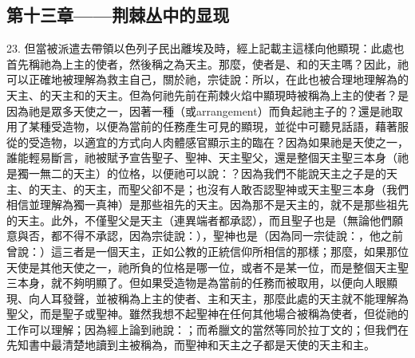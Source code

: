 
\subsection{第十三章——荆棘丛中的显现}

23. 但當被派遣去帶領以色列子民出離埃及時，經上記載主這樣向他顯現：此處也首先稱祂為上主的使者，然後稱之為天主。那麼，使者是、和的天主嗎？因此，祂可以正確地被理解為救主自己，關於祂，宗徒說：所以，在此也被合理地理解為的天主、的天主和的天主。但為何祂先前在荊棘火焰中顯現時被稱為上主的使者？是因為祂是眾多天使之一，因著一種（或arrangement）而負起祂主子的？還是祂取用了某種受造物，以便為當前的任務產生可見的顯現，並從中可聽見話語，藉著服從的受造物，以適宜的方式向人肉體感官顯示主的臨在？因為如果祂是天使之一，誰能輕易斷言，祂被賦予宣告聖子、聖神、天主聖父，還是整個天主聖三本身（祂是獨一無二的天主）的位格，以便祂可以說：？因為我們不能說天主之子是的天主、的天主、的天主，而聖父卻不是；也沒有人敢否認聖神或天主聖三本身（我們相信並理解為獨一真神）是那些祖先的天主。因為那不是天主的，就不是那些祖先的天主。此外，不僅聖父是天主（連異端者都承認），而且聖子也是（無論他們願意與否，都不得不承認，因為宗徒說：），聖神也是（因為同一宗徒說：，他之前曾說：）這三者是一個天主，正如公教的正統信仰所相信的那樣；那麼，如果那位天使是其他天使之一，祂所負的位格是哪一位，或者不是某一位，而是整個天主聖三本身，就不夠明顯了。但如果受造物是為當前的任務而被取用，以便向人眼顯現、向人耳發聲，並被稱為上主的使者、主和天主，那麼此處的天主就不能理解為聖父，而是聖子或聖神。雖然我想不起聖神在任何其他場合被稱為使者，但從祂的工作可以理解；因為經上論到祂說：；而希臘文的當然等同於拉丁文的；但我們在先知書中最清楚地讀到主被稱為，而聖神和天主之子都是天使的天主和主。\par

